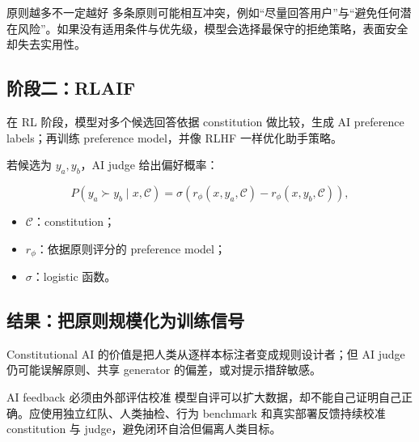 \documentclass[a4paper]{article}
\begin{document}

\begin{warningbox}{原则越多不一定越好}
多条原则可能相互冲突，例如“尽量回答用户”与“避免任何潜在风险”。如果没有适用条件与优先级，模型会选择最保守的拒绝策略，表面安全却失去实用性。
\end{warningbox}

\subsection{阶段二：RLAIF}

在 RL 阶段，模型对多个候选回答依据 constitution 做比较，生成 AI preference labels；再训练 preference model，并像 RLHF 一样优化助手策略。


若候选为 $y_a,y_b$，AI judge 给出偏好概率：

$$
P(y_a\succ y_b\mid x,\mathcal C)
=\sigma\!\left(r_\phi(x,y_a,\mathcal C)-r_\phi(x,y_b,\mathcal C)\right),
$$

\begin{itemize}
    \item $\mathcal C$：constitution；
    \item $r_\phi$：依据原则评分的 preference model；
    \item $\sigma$：logistic 函数。
\end{itemize}

\subsection{结果：把原则规模化为训练信号}


Constitutional AI 的价值是把人类从逐样本标注者变成规则设计者；但 AI judge 仍可能误解原则、共享 generator 的偏差，或对提示措辞敏感。

\begin{importantbox}{AI feedback 必须由外部评估校准}
模型自评可以扩大数据，却不能自己证明自己正确。应使用独立红队、人类抽检、行为 benchmark 和真实部署反馈持续校准 constitution 与 judge，避免闭环自洽但偏离人类目标。
\end{importantbox}
\end{document}
